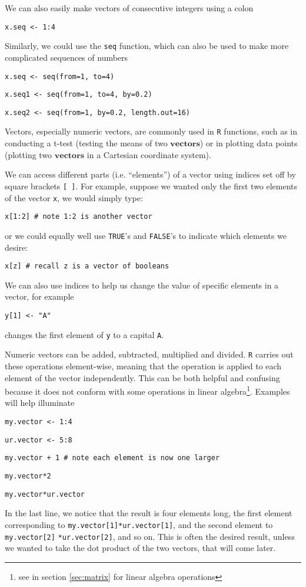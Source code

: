 \documentclass[12pt]{article}
\newcommand{\R}[1] {
	\item \texttt{#1}
}
\newenvironment{verbatim}{ 
	\indent
	\begin{list}{}{\setlength{\itemsep}{-1.5mm}}
}{
	\end{list}
}
\begin{document}
We can also easily make vectors of consecutive integers using a colon
\begin{verbatim}
	\R{x.seq <- 1:4}
\end{verbatim}
Similarly, we could use the \verb+seq+ function, which can also be used to make more complicated sequences of numbers
 \begin{verbatim}
	\R{x.seq <- seq(from=1, to=4)}
	\R{x.seq1 <- seq(from=1, to=4, by=0.2)}
	\R{x.seq2 <- seq(from=1, by=0.2, length.out=16)} 
\end{verbatim}

Vectors, especially numeric vectors, are commonly used in \verb+R+ functions, such as in conducting a t-test (testing the means of two $\mathbf{vectors}$) or in plotting data points (plotting two $\mathbf{vectors}$ in a Cartesian coordinate system).

We can access different parts (i.e. ``elements'') of a vector using indices set off by square brackets \verb+[ ]+.  For example, suppose we wanted only the first two elements of the vector \verb+x+, we would simply type:
\begin{verbatim}
	\R{x[1:2]	\# note 1:2 is another vector}
\end{verbatim}
or we could equally well use \verb+TRUE+'s and \verb+FALSE+'s to indicate which elements we desire:
\begin{verbatim}
	\R{x[z]	\# recall z is a vector of booleans}
\end{verbatim}
We can also use indices to help us change the value of specific elements in a vector, for example
\begin{verbatim}
	\R{y[1] <- "A"}
\end{verbatim}
changes the first element of \verb+y+ to a capital \verb+A+.

Numeric vectors can be added, subtracted, multiplied and divided.  \verb+R+ carries out these operations element-wise, meaning that the operation is applied to each element of the vector independently.  This can be both helpful and confusing because it does not conform with some operations in linear algebra\footnote{see in section \ref{sec:matrix} for linear algebra operations}.  Examples will help illuminate
\begin{verbatim}
	\R{my.vector <- 1:4}
	\R{ur.vector <- 5:8}
	\R{my.vector + 1	\# note each element is now one larger}
	\R{my.vector*2}
	\R{my.vector*ur.vector}
\end{verbatim}
In the last line, we notice that the result is four elements long, the first element corresponding to \verb+my.vector[1]*ur.vector[1]+, and the second element to \verb+my.vector[2]+ \verb+*ur.vector[2]+, and so on.  This is often the desired result, unless we wanted to take the dot product of the two vectors, that will come later.
\end{document}

